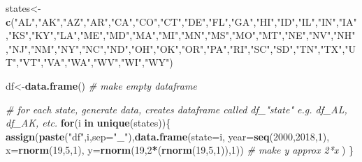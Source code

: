 \documentclass[]{book}
\newenvironment{Shaded}{\begin{snugshade}}{\end{snugshade}}
\newcommand{\KeywordTok}[1]{\textcolor[rgb]{0.13,0.29,0.53}{\textbf{#1}}}
\newcommand{\DataTypeTok}[1]{\textcolor[rgb]{0.13,0.29,0.53}{#1}}
\newcommand{\DecValTok}[1]{\textcolor[rgb]{0.00,0.00,0.81}{#1}}
\newcommand{\StringTok}[1]{\textcolor[rgb]{0.31,0.60,0.02}{#1}}
\newcommand{\CommentTok}[1]{\textcolor[rgb]{0.56,0.35,0.01}{\textit{#1}}}
\newcommand{\ControlFlowTok}[1]{\textcolor[rgb]{0.13,0.29,0.53}{\textbf{#1}}}
\newcommand{\OperatorTok}[1]{\textcolor[rgb]{0.81,0.36,0.00}{\textbf{#1}}}
\newcommand{\NormalTok}[1]{#1}
\theoremstyle{definition}
\theoremstyle{definition}
\theoremstyle{definition}
\theoremstyle{remark}
\begin{document}
\begin{Shaded}
\begin{Highlighting}[]
\NormalTok{states<-}\KeywordTok{c}\NormalTok{(}\StringTok{"AL"}\NormalTok{,}\StringTok{"AK"}\NormalTok{,}\StringTok{"AZ"}\NormalTok{,}\StringTok{"AR"}\NormalTok{,}\StringTok{"CA"}\NormalTok{,}\StringTok{"CO"}\NormalTok{,}\StringTok{"CT"}\NormalTok{,}\StringTok{"DE"}\NormalTok{,}\StringTok{"FL"}\NormalTok{,}\StringTok{"GA"}\NormalTok{,}\StringTok{"HI"}\NormalTok{,}\StringTok{"ID"}\NormalTok{,}\StringTok{"IL"}\NormalTok{,}\StringTok{"IN"}\NormalTok{,}\StringTok{"IA"}\NormalTok{,}\StringTok{"KS"}\NormalTok{,}\StringTok{"KY"}\NormalTok{,}\StringTok{"LA"}\NormalTok{,}\StringTok{"ME"}\NormalTok{,}\StringTok{"MD"}\NormalTok{,}\StringTok{"MA"}\NormalTok{,}\StringTok{"MI"}\NormalTok{,}\StringTok{"MN"}\NormalTok{,}\StringTok{"MS"}\NormalTok{,}\StringTok{"MO"}\NormalTok{,}\StringTok{"MT"}\NormalTok{,}\StringTok{"NE"}\NormalTok{,}\StringTok{"NV"}\NormalTok{,}\StringTok{"NH"}\NormalTok{,}\StringTok{"NJ"}\NormalTok{,}\StringTok{"NM"}\NormalTok{,}\StringTok{"NY"}\NormalTok{,}\StringTok{"NC"}\NormalTok{,}\StringTok{"ND"}\NormalTok{,}\StringTok{"OH"}\NormalTok{,}\StringTok{"OK"}\NormalTok{,}\StringTok{"OR"}\NormalTok{,}\StringTok{"PA"}\NormalTok{,}\StringTok{"RI"}\NormalTok{,}\StringTok{"SC"}\NormalTok{,}\StringTok{"SD"}\NormalTok{,}\StringTok{"TN"}\NormalTok{,}\StringTok{"TX"}\NormalTok{,}\StringTok{"UT"}\NormalTok{,}\StringTok{"VT"}\NormalTok{,}\StringTok{"VA"}\NormalTok{,}\StringTok{"WA"}\NormalTok{,}\StringTok{"WV"}\NormalTok{,}\StringTok{"WI"}\NormalTok{,}\StringTok{"WY"}\NormalTok{)}

\NormalTok{df<-}\KeywordTok{data.frame}\NormalTok{() }\CommentTok{# make empty dataframe}

\CommentTok{# for each state, generate data, creates dataframe called df_"state" e.g. df_AL, df_AK, etc. }
\ControlFlowTok{for}\NormalTok{(i }\ControlFlowTok{in} \KeywordTok{unique}\NormalTok{(states))\{}
  \KeywordTok{assign}\NormalTok{(}\KeywordTok{paste}\NormalTok{(}\StringTok{"df"}\NormalTok{,i,}\DataTypeTok{sep=}\StringTok{"_"}\NormalTok{),}\KeywordTok{data.frame}\NormalTok{(}\DataTypeTok{state=}\NormalTok{i,}
                \DataTypeTok{year=}\KeywordTok{seq}\NormalTok{(}\DecValTok{2000}\NormalTok{,}\DecValTok{2018}\NormalTok{,}\DecValTok{1}\NormalTok{),}
                \DataTypeTok{x=}\KeywordTok{rnorm}\NormalTok{(}\DecValTok{19}\NormalTok{,}\DecValTok{5}\NormalTok{,}\DecValTok{1}\NormalTok{),}
                \DataTypeTok{y=}\KeywordTok{rnorm}\NormalTok{(}\DecValTok{19}\NormalTok{,}\DecValTok{2}\OperatorTok{*}\NormalTok{(}\KeywordTok{rnorm}\NormalTok{(}\DecValTok{19}\NormalTok{,}\DecValTok{5}\NormalTok{,}\DecValTok{1}\NormalTok{)),}\DecValTok{1}\NormalTok{)) }\CommentTok{# make y approx 2*x }
\NormalTok{  )}
\NormalTok{\}}


\end{Highlighting}
\end{Shaded}
\end{document}
